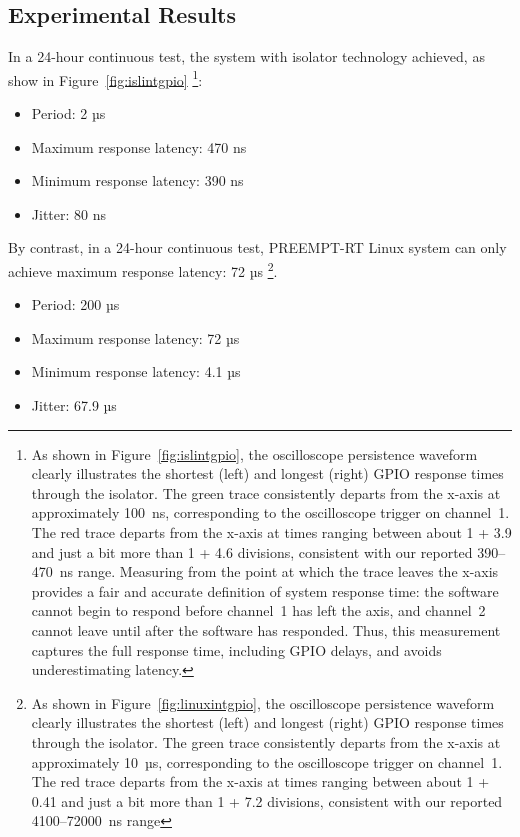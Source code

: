 \documentclass[letterpaper]{article}
\begin{document}
\subsection{Experimental Results}
In a 24-hour continuous test, the system with isolator technology achieved, as show in Figure~\ref{fig:islintgpio} \footnote {
As shown in Figure~\ref{fig:islintgpio}, the oscilloscope persistence waveform clearly
illustrates the shortest (left) and longest (right) GPIO response times
through the isolator. The green trace consistently departs from the
x-axis at approximately 100~ns, corresponding to the oscilloscope
trigger on channel~1. The red trace departs from the x-axis at times
ranging between about 1 + 3.9 and just a bit more than 1 + 4.6 divisions, consistent with our
reported 390--470~ns range. Measuring from the point at which the trace
leaves the x-axis provides a fair and accurate definition of system
response time: the software cannot begin to respond before channel~1
has left the axis, and channel~2 cannot leave until after the software
has responded. Thus, this measurement captures the full response time,
including GPIO delays, and avoids underestimating latency.
}:
\begin{itemize}
    \item Period: 2 µs
    \item Maximum response latency: 470 ns
    \item Minimum response latency: 390 ns
    \item Jitter: 80 ns
\end{itemize}


By contrast, in a 24-hour continuous test,  PREEMPT-RT Linux system can only achieve maximum response latency:
72 µs  \footnote {
As shown in Figure~\ref{fig:linuxintgpio}, the oscilloscope persistence waveform clearly
illustrates the shortest (left) and longest (right) GPIO response times
through the isolator. The green trace consistently departs from the
x-axis at approximately 10~µs, corresponding to the oscilloscope
trigger on channel~1. The red trace departs from the x-axis at times
ranging between about 1 + 0.41 and just a bit more than 1 + 7.2 divisions, consistent with our
reported 4100--72000~ns range}.
\begin{itemize}
    \item Period: 200 µs
    \item Maximum response latency: 72  µs
    \item Minimum response latency: 4.1 µs
    \item Jitter: 67.9 µs
\end{itemize}
\end{document}

